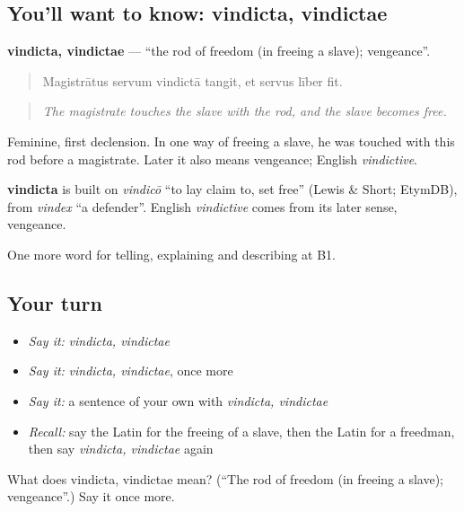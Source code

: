 \subsection*{You'll want to know: vindicta, vindictae}
\textbf{vindicta, vindictae} — \textquotedblleft{}the rod of freedom (in freeing a slave); vengeance\textquotedblright{}.

\begin{quote}
Magistrātus servum vindictā tangit, et servus līber fit.
\end{quote}

\begin{quote}
\emph{The magistrate touches the slave with the rod, and the slave becomes free.}
\end{quote}

Feminine, first declension. In one way of freeing a slave, he was touched with this rod before a magistrate. Later it also means vengeance; English \emph{vindictive}.

\begin{cousinweb}
\textbf{vindicta} is built on \emph{vindicō} \textquotedblleft{}to lay claim to, set free\textquotedblright{} (Lewis \& Short; EtymDB), from \emph{vindex} \textquotedblleft{}a defender\textquotedblright{}. English \emph{vindictive} comes from its later sense, vengeance.
\end{cousinweb}

\begin{grammarlens}[title={What you've built}]
One more word for telling, explaining and describing at B1.
\end{grammarlens}

\subsection*{Your turn}
\begin{itemize}
\raggedright
  \item \emph{Say it:} \emph{vindicta, vindictae}
  \item \emph{Say it:} \emph{vindicta, vindictae}, once more
  \item \emph{Say it:} a sentence of your own with \emph{vindicta, vindictae}
  \item \emph{Recall:} say the Latin for the freeing of a slave, then the Latin for a freedman, then say \emph{vindicta, vindictae} again
\end{itemize}

\begin{tcolorbox}[breakable,colback=teal!4,colframe=teal!35!black,title={Before you move on}]
What does vindicta, vindictae mean? (\textquotedblleft{}The rod of freedom (in freeing a slave); vengeance\textquotedblright{}.) Say it once more.
\end{tcolorbox}
